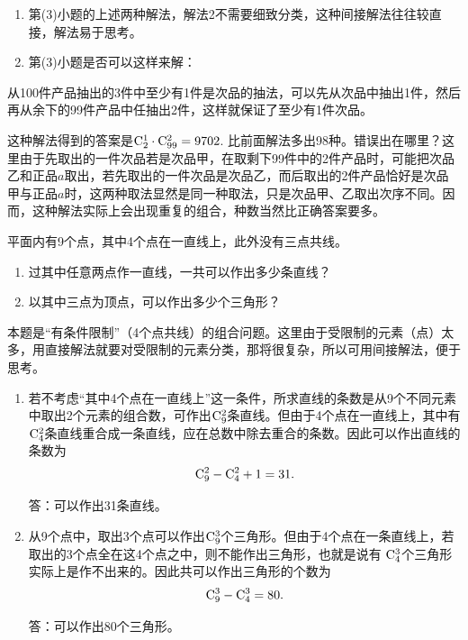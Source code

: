 \begin{rmk}
\begin{enumerate}
    \item 第(3)小题的上述两种解法，解法2不需要细致分类，这种间接解法往往较直接，解法易于思考。
    \item 第(3)小题是否可以这样来解：
\end{enumerate}

从100件产品抽出的3件中至少有1件是次品的抽法，可以先从次品中抽出1件，然后再从余下的99件产品中任抽出2件，这样就保证了至少有1件次品。

这种解法得到的答案是$ \comb{2}{1}\cdot  \comb{99}{2}=9702$. 比前面解法多出98种。错误出在哪里？这里由于先取出的一件次品若是次品甲，在取剩下99件中的2件产品时，可能把次品乙和正品$a$取出，若先取出的一件次品是次品乙，而后取出的2件产品恰好是次品甲与正品$a$时，这两种取法显然是同一种取法，只是次品甲、乙取出次序不同。因而，这种解法实际上会出现重复的组合，种数当然比正确答案要多。
\end{rmk}

\begin{example}
    平面内有9个点，其中4个点在一直线上，此外没有三点共线。
\begin{enumerate}[(1)]
    \item 过其中任意两点作一直线，一共可以作出多少条直线？
    \item 以其中三点为顶点，可以作出多少个三角形？
\end{enumerate}
\end{example}

\begin{analyze}
    本题是“有条件限制”（4个点共线）的组合问题。这里由于受限制的元素（点）太多，用直接解法就要对受限制的元素分类，那将很复杂，所以可用间接解法，便于思考。
\end{analyze}

\begin{solution}
\begin{enumerate}[(1)]
    \item 若不考虑“其中4个点在一直线上”这一条件，所求直线的条数是从9个不同元素中取出2个元素的组合数，可作出$ \comb{9}{2} $条直线。但由于4个点在一直线上，其中有$ \comb{4}{2} $条直线重合成一条直线，应在总数中除去重合的条数。因此可以作出直线的条数为
\[
\comb{9}{2}-\comb{4}{2}+1=31.\]

答：可以作出31条直线。

\item 从9个点中，取出3个点可以作出$ \comb{9}{3} $个三角形。但由于4个点在一条直线上，若取出的3个点全在这4个点之中，则不能作出三角形，也就是说有 $\comb{4}{3} $个三角形实际上是作不出来的。因此共可以作出三角形的个数为
\[
\comb{9}{3}-\comb{4}{3}=80.\]

答：可以作出80个三角形。


\end{enumerate}
\end{solution}


